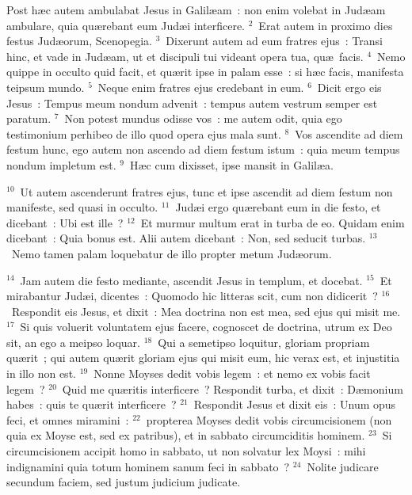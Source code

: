\lettrine[lines=3,image=true,loversize=0.05,lraise=-0.03]{P}{}ost h\ae c autem ambulabat Jesus in Galil\ae am~: non enim volebat in Jud\ae am ambulare, quia qu\ae rebant eum Jud\ae i interficere.
${}^{2}$~Erat autem in proximo dies festus Jud\ae orum, Scenopegia.
${}^{3}$~Dixerunt autem ad eum fratres ejus~: Transi hinc, et vade in Jud\ae am, ut et discipuli tui videant opera tua, qu\ae\ facis.
${}^{4}$~Nemo quippe in occulto quid facit, et qu\ae rit ipse in palam esse~: si h\ae c facis, manifesta teipsum mundo.
${}^{5}$~Neque enim fratres ejus credebant in eum.
${}^{6}$~Dicit ergo eis Jesus~: Tempus meum nondum advenit~: tempus autem vestrum semper est paratum.
${}^{7}$~Non potest mundus odisse vos~: me autem odit, quia ego testimonium perhibeo de illo quod opera ejus mala sunt.
${}^{8}$~Vos ascendite ad diem festum hunc, ego autem non ascendo ad diem festum istum~: quia meum tempus nondum impletum est.
${}^{9}$~H\ae c cum dixisset, ipse mansit in Galil\ae a.


${}^{10}$~Ut autem ascenderunt fratres ejus, tunc et ipse ascendit ad diem festum non manifeste, sed quasi in occulto.
${}^{11}$~Jud\ae i ergo qu\ae rebant eum in die festo, et dicebant~: Ubi est ille~?
${}^{12}$~Et murmur multum erat in turba de eo. Quidam enim dicebant~: Quia bonus est. Alii autem dicebant~: Non, sed seducit turbas.
${}^{13}$~Nemo tamen palam loquebatur de illo propter metum Jud\ae orum.


${}^{14}$~Jam autem die festo mediante, ascendit Jesus in templum, et docebat.
${}^{15}$~Et mirabantur Jud\ae i, dicentes~: Quomodo hic litteras scit, cum non didicerit~?
${}^{16}$~Respondit eis Jesus, et dixit~: Mea doctrina non est mea, sed ejus qui misit me.
${}^{17}$~Si quis voluerit voluntatem ejus facere, cognoscet de doctrina, utrum ex Deo sit, an ego a meipso loquar.
${}^{18}$~Qui a semetipso loquitur, gloriam propriam qu\ae rit~; qui autem qu\ae rit gloriam ejus qui misit eum, hic verax est, et injustitia in illo non est.
${}^{19}$~Nonne Moyses dedit vobis legem~: et nemo ex vobis facit legem~?
${}^{20}$~Quid me qu\ae ritis interficere~? Respondit turba, et dixit~: D\ae monium habes~: quis te qu\ae rit interficere~?
${}^{21}$~Respondit Jesus et dixit eis~: Unum opus feci, et omnes miramini~:
${}^{22}$~propterea Moyses dedit vobis circumcisionem (non quia ex Moyse est, sed ex patribus), et in sabbato circumciditis hominem.
${}^{23}$~Si circumcisionem accipit homo in sabbato, ut non solvatur lex Moysi~: mihi indignamini quia totum hominem sanum feci in sabbato~?
${}^{24}$~Nolite judicare secundum faciem, sed justum judicium judicate.


